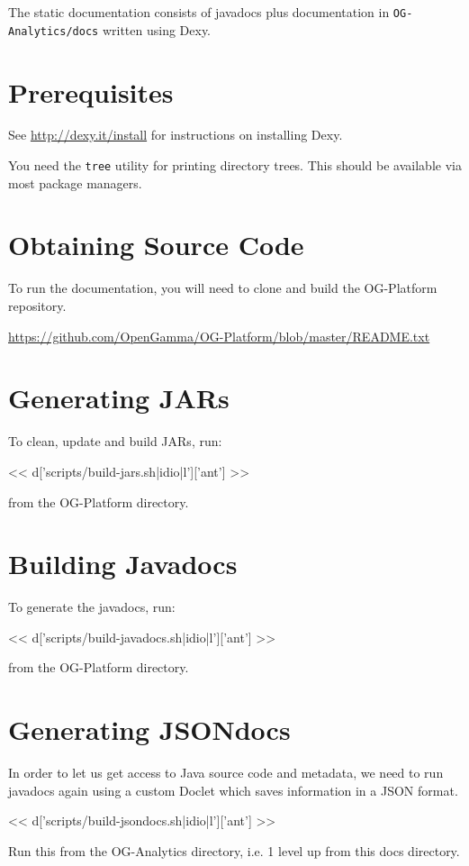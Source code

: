 The static documentation consists of javadocs plus documentation in
\verb|OG-Analytics/docs| written using Dexy.

\section{Prerequisites}

See \url{http://dexy.it/install} for instructions on installing Dexy.

You need the \verb|tree| utility for printing directory trees. This should be
available via most package managers.

\section{Obtaining Source Code}

To run the documentation, you will need to clone and build the OG-Platform repository.

\url{https://github.com/OpenGamma/OG-Platform/blob/master/README.txt}

\section{Generating JARs}

To clean, update and build JARs, run:

<< d['scripts/build-jars.sh|idio|l']['ant'] >>

from the OG-Platform directory.

\section{Building Javadocs}

To generate the javadocs, run:

<< d['scripts/build-javadocs.sh|idio|l']['ant'] >>

from the OG-Platform directory.

\section{Generating JSONdocs}

In order to let us get access to Java source code and metadata, we need to run
javadocs again using a custom Doclet which saves information in a JSON format.

<< d['scripts/build-jsondocs.sh|idio|l']['ant'] >>

Run this from the OG-Analytics directory, i.e. 1 level up from this docs directory.

